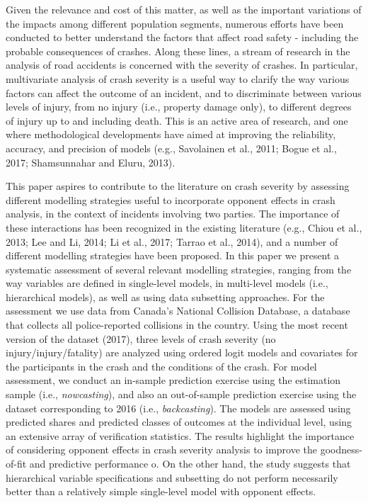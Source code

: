 \documentclass[]{elsarticle} %
\begin{document}
Given the relevance and cost of this matter, as well as the important
variations of the impacts among different population segments, numerous
efforts have been conducted to better understand the factors that affect
road safety - including the probable consequences of crashes. Along
these lines, a stream of research in the analysis of road accidents is
concerned with the severity of crashes. In particular, multivariate
analysis of crash severity is a useful way to clarify the way various
factors can affect the outcome of an incident, and to discriminate
between various levels of injury, from no injury (i.e., property damage
only), to different degrees of injury up to and including death. This is
an active area of research, and one where methodological developments
have aimed at improving the reliability, accuracy, and precision of
models (e.g., Savolainen et al., 2011; Bogue et al., 2017; Shamsunnahar
and Eluru, 2013).

This paper aspires to contribute to the literature on crash severity by
assessing different modelling strategies useful to incorporate opponent
effects in crash analysis, in the context of incidents involving two
parties. The importance of these interactions has been recognized in the
existing literature (e.g., Chiou et al., 2013; Lee and Li, 2014; Li et
al., 2017; Tarrao et al., 2014), and a number of different modelling
strategies have been proposed. In this paper we present a systematic
assessment of several relevant modelling strategies, ranging from the
way variables are defined in single-level models, in multi-level models
(i.e., hierarchical models), as well as using data subsetting
approaches. For the assessment we use data from Canada's National
Collision Database, a database that collects all police-reported
collisions in the country. Using the most recent version of the dataset
(2017), three levels of crash severity (no injury/injury/fatality) are
analyzed using ordered logit models and covariates for the participants
in the crash and the conditions of the crash. For model assessment, we
conduct an in-sample prediction exercise using the estimation sample
(i.e., \emph{nowcasting}), and also an out-of-sample prediction exercise
using the dataset corresponding to 2016 (i.e., \emph{backcasting}). The
models are assessed using predicted shares and predicted classes of
outcomes at the individual level, using an extensive array of
verification statistics. The results highlight the importance of
considering opponent effects in crash severity analysis to improve the
goodness-of-fit and predictive performance o. On the other hand, the
study suggests that hierarchical variable specifications and subsetting
do not perform necessarily better than a relatively simple single-level
model with opponent effects.
\end{document}
